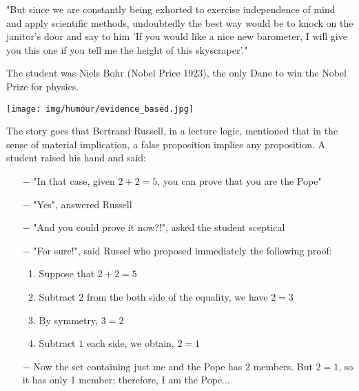 "But since we are constantly being exhorted to exercise independence of mind and apply scientific methods, undoubtedly the best way would be to knock on the janitor's door and say to him 'If you would like a nice new barometer, I will give you this one if you tell me the height of this skyscraper'." 

The student was Niels Bohr (Nobel Price 1923), the only Dane to win the Nobel Prize for physics. 
\begin{center}\underline{\hspace{5 cm}}\end{center}
\begin{center}
	\texttt{[image: img/humour/evidence\_based.jpg]}	
\end{center}
\pagebreak
The story goes that Bertrand Russell, in a lecture logic, mentioned that in the sense of material implication, a false proposition implies any proposition. A student raised his hand and said:

\begin{itemize}	 
	\item[$-$] "In that case, given $2+2=5$, you can prove that you are the Pope"

	\item[$-$] "Yes", answered Russell

	\item[$-$] "And you could prove it now?!", asked the student sceptical

	\item[$-$] "For sure!", said Russel who proposed immediately the following proof:

	\begin{enumerate}
		\item Suppose that $2 + 2 = 5$

		\item Subtract $2$ from the both side of the equality, we have $2 = 3$

		\item By symmetry, $3 = 2$

		\item Subtract $1$ each side, we obtain, $2 =1$
	\end{enumerate}

	\item[$-$] Now the set containing just me and the Pope has $2$ members. But $2=1$, so it has only 1 member; therefore, I am the Pope...
\end{itemize}

	\begin{center}\underline{\hspace{5 cm}}\end{center}
	

